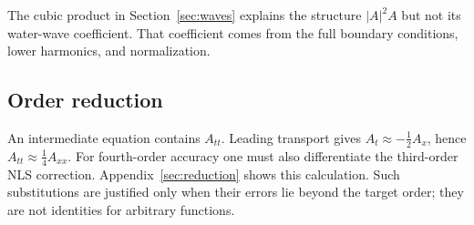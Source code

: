 The cubic product in Section~\ref{sec:waves} explains the structure
$|A|^2A$ but not its water-wave coefficient. That coefficient comes from
the full boundary conditions, lower harmonics, and normalization.

\subsection{Order reduction}
An intermediate equation contains $A_{tt}$. Leading transport gives
$A_t\approx-\tfrac12A_x$, hence $A_{tt}\approx\tfrac14A_{xx}$.
For fourth-order accuracy one must also differentiate the third-order NLS
correction. Appendix~\ref{sec:reduction} shows this calculation.
Such substitutions are justified only when their errors lie beyond the
target order; they are not identities for arbitrary functions.

\clearpage
